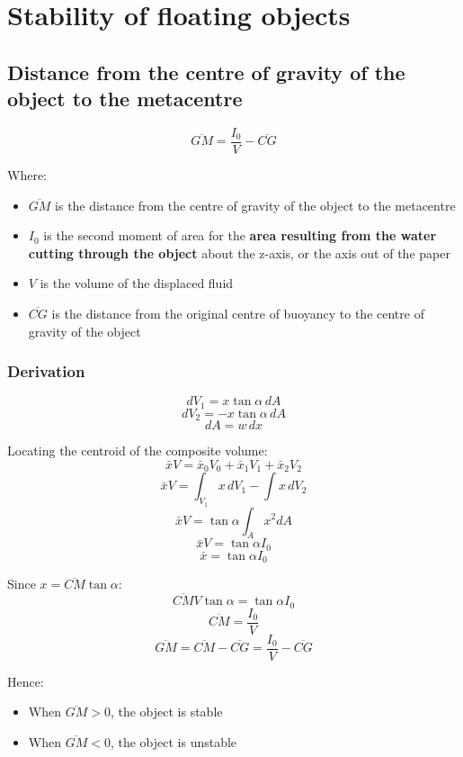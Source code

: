 \documentclass[11pt]{article}
\begin{document}
\newpage

\section{Stability of floating objects}
\label{sec:orgcf71c47}

\subsection{Distance from the centre of gravity of the object to the metacentre}
\label{sec:org14525b0}
\[\overline{GM} = \frac{I_0}{V} - \overline{CG}\]

Where:
\begin{itemize}
\item \(\overline{GM}\) is the distance from the centre of gravity of the object to the metacentre
\item \(I_0\) is the second moment of area for the \textbf{area resulting from the water cutting through the object} about the z-axis, or the axis out of the paper
\item \(V\) is the volume of the displaced fluid
\item \(\overline{CG}\) is the distance from the original centre of buoyancy to the centre of gravity of the object
\end{itemize}

\subsubsection{Derivation}
\label{sec:orgb85d161}
\[dV_1 = x \tan \alpha \, dA\]
\[dV_2 = - x \tan \alpha \, dA\]
\[dA = w \, dx\]

Locating the centroid of the composite volume:
\[\bar{x} V = \bar{x}_0 V_0 + \bar{x}_1 V_1 + \bar{x}_2 V_2\]
\[\bar{x} V = \int_{V_1} x \, dV_1 - \int x \, dV_2\]
\[\bar{x} V = \tan \alpha \int_A x^2 dA\]
\[\bar{x} V = \tan \alpha I_0\]
\[\bar{x} = \tan \alpha I_0\]

Since \(x = \overline{CM} \tan \alpha\):
\[\overline{CM} V \tan \alpha = \tan \alpha I_0\]
\[\overline{CM} = \frac{I_0}{V}\]
\[\overline{GM} = \overline{CM} - \overline{CG} = \frac{I_0}{V} - \overline{CG}\]

\newpage

Hence:
\begin{itemize}
\item When \(\overline{GM} > 0\), the object is stable
\item When \(\overline{GM} < 0\), the object is unstable
\end{itemize}
\end{document}
